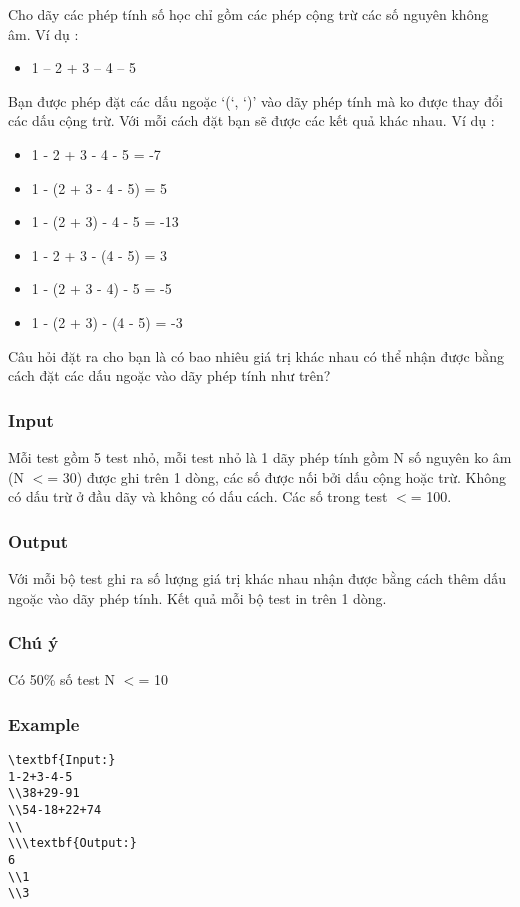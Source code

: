 



   Cho dãy các phép tính số học chỉ gồm các phép cộng trừ các số nguyên không âm. Ví dụ :  
\begin{itemize}
	\item     1 – 2 + 3 – 4 – 5   
\end{itemize}

   Bạn  được phép đặt các dấu ngoặc ‘(‘, ‘)’ vào dãy phép tính mà ko được thay  đổi các dấu cộng trừ. Với mỗi cách đặt bạn sẽ được các kết quả khác  nhau. Ví dụ :  
\begin{itemize}
	\item     1 - 2 + 3 - 4 - 5 = -7   
	\item     1 - (2 + 3 - 4 - 5) = 5   
	\item     1 - (2 + 3) - 4 - 5 = -13   
	\item     1 - 2 + 3 - (4 - 5) = 3   
	\item     1 - (2 + 3 - 4) - 5 = -5   
	\item     1 - (2 + 3) - (4 - 5) = -3   
\end{itemize}

   Câu hỏi đặt ra cho bạn là có bao nhiêu giá trị khác nhau có thể nhận  được bằng cách đặt các dấu ngoặc vào dãy phép tính như trên?  

\subsubsection{   Input  }

   Mỗi test gồm 5 test nhỏ, mỗi test nhỏ là 1 dãy phép tính gồm N số nguyên ko âm (N $<$= 30) được ghi trên 1 dòng, các số được nối bởi dấu cộng hoặc trừ. Không có dấu trừ ở đầu dãy và không có dấu cách. Các số trong test $<$= 100.  

\subsubsection{   Output  }

   Với mỗi bộ test ghi ra số lượng giá trị khác nhau nhận được bằng cách thêm dấu ngoặc vào dãy phép tính. Kết quả mỗi bộ test in trên 1 dòng.  

\subsubsection{   Chú ý  }

   Có 50\% số test N $<$= 10  

\subsubsection{   Example  }
\begin{verbatim}
\textbf{Input:}
1-2+3-4-5
\\38+29-91
\\54-18+22+74
\\
\\\textbf{Output:}
6
\\1
\\3 \end{verbatim}